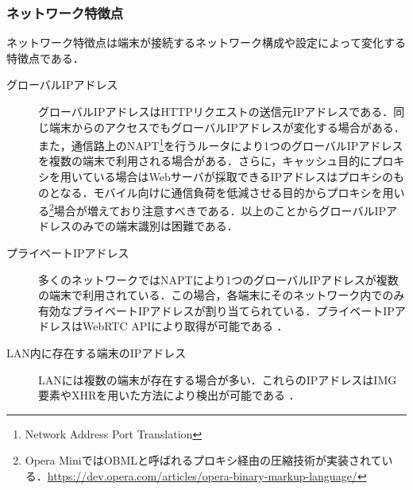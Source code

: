 \subsubsection{ネットワーク特徴点}
ネットワーク特徴点は端末が接続するネットワーク構成や設定によって変化する特徴点である．
\begin{description}
\item[グローバルIPアドレス]グローバルIPアドレスはHTTPリクエストの送信元IPアドレスである．同じ端末からのアクセスでもグローバルIPアドレスが変化する場合がある．また，通信路上のNAPT\footnote{Network Address Port Translation}を行うルータにより1つのグローバルIPアドレスを複数の端末で利用される場合がある．さらに，キャッシュ目的にプロキシを用いている場合はWebサーバが採取できるIPアドレスはプロキシのものとなる．モバイル向けに通信負荷を低減させる目的からプロキシを用いる\footnote{Opera MiniではOBMLと呼ばれるプロキシ経由の圧縮技術が実装されている．\url{https://dev.opera.com/articles/opera-binary-markup-language/}}場合が増えており注意すべきである．以上のことからグローバルIPアドレスのみでの端末識別は困難である．
\item[プライベートIPアドレス]多くのネットワークではNAPTにより1つのグローバルIPアドレスが複数の端末で利用されている．この場合，各端末にそのネットワーク内でのみ有効なプライベートIPアドレスが割り当てられている．プライベートIPアドレスはWebRTC APIにより取得が可能である\cite{細井理央2015ブラウザが属するネットワークの情報を採取する} ．
\item[LAN内に存在する端末のIPアドレス]LANには複数の端末が存在する場合が多い．これらのIPアドレスはIMG要素やXHRを用いた方法により検出が可能である\cite{細井理央2015ブラウザが属するネットワークの情報を採取する} ．
\end{description}

